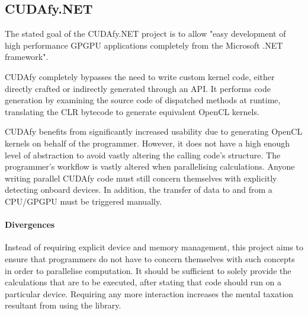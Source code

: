 \subsection{CUDAfy.NET}
The stated goal of the CUDAfy.NET\cite{cudafy} project is to allow "easy development of high performance \ac{GPGPU} applications completely from the Microsoft .NET framework".

CUDAfy completely bypasses the need to write custom kernel code, either directly crafted or indirectly generated through an API. It performs code generation by examining the source code of dispatched methods at runtime, translating the \ac{CLR} bytecode to generate equivalent \ac{OpenCL} kernels.

CUDAfy benefits from significantly increased usability due to generating \ac{OpenCL} kernels on behalf of the programmer. However, it does not have a high enough level of abstraction to avoid vastly altering the calling code's structure. The programmer's workflow is vastly altered when parallelising calculations. Anyone writing parallel CUDAfy code must still concern themselves with explicitly detecting onboard devices. In addition, the transfer of data to and from a \ac{CPU}/\ac{GPGPU} must be triggered manually.

\paragraph*{Divergences}
Instead of requiring explicit device and memory management, this project aims to ensure that programmers do not have to concern themselves with such concepts in order to parallelise computation. It should be sufficient to solely provide the calculations that are to be executed, after stating that code should run on a particular device. Requiring any more interaction increases the mental taxation resultant from using the library.
